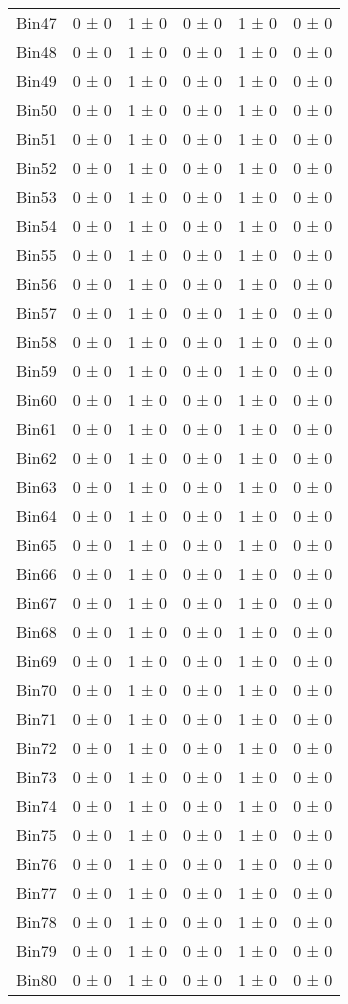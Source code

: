 \begin{tabular}{@{\extracolsep{4pt}}lccccc@{}}
     Bin47 & 0 ± 0 & 1 ± 0 & 0 ± 0 & 1 ± 0 & 0 ± 0 \\ 
     Bin48 & 0 ± 0 & 1 ± 0 & 0 ± 0 & 1 ± 0 & 0 ± 0 \\ 
     Bin49 & 0 ± 0 & 1 ± 0 & 0 ± 0 & 1 ± 0 & 0 ± 0 \\ 
     Bin50 & 0 ± 0 & 1 ± 0 & 0 ± 0 & 1 ± 0 & 0 ± 0 \\ 
     Bin51 & 0 ± 0 & 1 ± 0 & 0 ± 0 & 1 ± 0 & 0 ± 0 \\ 
     Bin52 & 0 ± 0 & 1 ± 0 & 0 ± 0 & 1 ± 0 & 0 ± 0 \\ 
     Bin53 & 0 ± 0 & 1 ± 0 & 0 ± 0 & 1 ± 0 & 0 ± 0 \\ 
     Bin54 & 0 ± 0 & 1 ± 0 & 0 ± 0 & 1 ± 0 & 0 ± 0 \\ 
     Bin55 & 0 ± 0 & 1 ± 0 & 0 ± 0 & 1 ± 0 & 0 ± 0 \\ 
     Bin56 & 0 ± 0 & 1 ± 0 & 0 ± 0 & 1 ± 0 & 0 ± 0 \\ 
     Bin57 & 0 ± 0 & 1 ± 0 & 0 ± 0 & 1 ± 0 & 0 ± 0 \\ 
     Bin58 & 0 ± 0 & 1 ± 0 & 0 ± 0 & 1 ± 0 & 0 ± 0 \\ 
     Bin59 & 0 ± 0 & 1 ± 0 & 0 ± 0 & 1 ± 0 & 0 ± 0 \\ 
     Bin60 & 0 ± 0 & 1 ± 0 & 0 ± 0 & 1 ± 0 & 0 ± 0 \\ 
     Bin61 & 0 ± 0 & 1 ± 0 & 0 ± 0 & 1 ± 0 & 0 ± 0 \\ 
     Bin62 & 0 ± 0 & 1 ± 0 & 0 ± 0 & 1 ± 0 & 0 ± 0 \\ 
     Bin63 & 0 ± 0 & 1 ± 0 & 0 ± 0 & 1 ± 0 & 0 ± 0 \\ 
     Bin64 & 0 ± 0 & 1 ± 0 & 0 ± 0 & 1 ± 0 & 0 ± 0 \\ 
     Bin65 & 0 ± 0 & 1 ± 0 & 0 ± 0 & 1 ± 0 & 0 ± 0 \\ 
     Bin66 & 0 ± 0 & 1 ± 0 & 0 ± 0 & 1 ± 0 & 0 ± 0 \\ 
     Bin67 & 0 ± 0 & 1 ± 0 & 0 ± 0 & 1 ± 0 & 0 ± 0 \\ 
     Bin68 & 0 ± 0 & 1 ± 0 & 0 ± 0 & 1 ± 0 & 0 ± 0 \\ 
     Bin69 & 0 ± 0 & 1 ± 0 & 0 ± 0 & 1 ± 0 & 0 ± 0 \\ 
     Bin70 & 0 ± 0 & 1 ± 0 & 0 ± 0 & 1 ± 0 & 0 ± 0 \\ 
     Bin71 & 0 ± 0 & 1 ± 0 & 0 ± 0 & 1 ± 0 & 0 ± 0 \\ 
     Bin72 & 0 ± 0 & 1 ± 0 & 0 ± 0 & 1 ± 0 & 0 ± 0 \\ 
     Bin73 & 0 ± 0 & 1 ± 0 & 0 ± 0 & 1 ± 0 & 0 ± 0 \\ 
     Bin74 & 0 ± 0 & 1 ± 0 & 0 ± 0 & 1 ± 0 & 0 ± 0 \\ 
     Bin75 & 0 ± 0 & 1 ± 0 & 0 ± 0 & 1 ± 0 & 0 ± 0 \\ 
     Bin76 & 0 ± 0 & 1 ± 0 & 0 ± 0 & 1 ± 0 & 0 ± 0 \\ 
     Bin77 & 0 ± 0 & 1 ± 0 & 0 ± 0 & 1 ± 0 & 0 ± 0 \\ 
     Bin78 & 0 ± 0 & 1 ± 0 & 0 ± 0 & 1 ± 0 & 0 ± 0 \\ 
     Bin79 & 0 ± 0 & 1 ± 0 & 0 ± 0 & 1 ± 0 & 0 ± 0 \\ 
     Bin80 & 0 ± 0 & 1 ± 0 & 0 ± 0 & 1 ± 0 & 0 ± 0 \\ 
\hline\hline
  \end{tabular}
